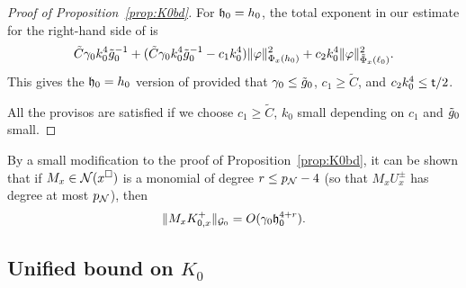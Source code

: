 \begin{proof}[Proof of Proposition~\ref{prop:K0bd}]
For $\mathfrak{h}_0=h_0$, the total exponent in our estimate for the right-hand side of 
is
\begin{equation}
    \tilde C \gamma_0 k_0^4 \tilde{g}_0^{-1}
        + (\tilde C \gamma_0 k_0^4 \tilde{g}_0^{-1} - c_1 k_0^4) \|\varphi\|^2_{\Phi_x(h_0)}
        + c_2 k_0^4 \|\varphi\|^2_{\tilde\Phi_x(\ell_0)}.
\end{equation}
This gives the $\mathfrak{h}_0=h_0$ version of  provided that
$\gamma_0 \le \tilde{g}_0$, $c_1\ge \tilde C$, and $c_2 k_0^4 \le {\sf t}/2$.

All the provisos are satisfied if we choose
$c_1 \ge \tilde C$, $k_0$ small depending on $c_1$
and $\tilde{g}_0$ small.
\end{proof}

\begin{rk}
By a small modification to the proof of Proposition~\ref{prop:K0bd},
it can be shown that if $M_x \in \mathcal{N}(x^\square)$ is a monomial of
degree $r \le p_{\mathcal{N}} -4$ (so that $M_xU_x^\pm$ has degree at most $p_{\mathcal{N}}$), then
\begin{equation}
\label{e:K0bd-gen}
\|M_x K^+_{0,x}\|_{\mathcal{G}_0} = O(\gamma_0 \mathfrak{h}_0^{4+r}).
\end{equation}
\end{rk}


\subsection{Unified bound on \texorpdfstring{$K_0$}{K0}}
\label{sec:KWcal}


